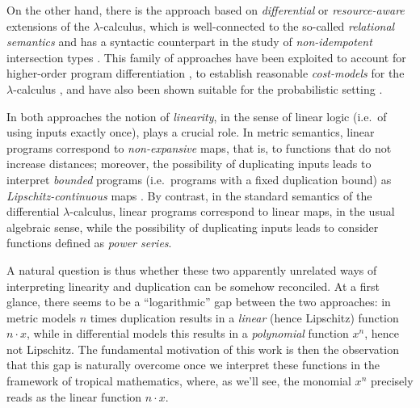 On the other hand, there is the approach based on \emph{differential} \cite{difflambda} or \emph{resource-aware} \cite{Boudol1993} extensions of the $\lambda$-calculus, which is well-connected to the so-called \emph{relational semantics} \cite{Manzo2012, Manzo2013, dill} and has a syntactic counterpart in the study of \emph{non-idempotent} intersection types \cite{decarvalho2018, Mazza2016}. This family of approaches have been exploited to account for higher-order program differentiation \cite{difflambda}, to establish reasonable \emph{cost-models} for the $\lambda$-calculus \cite{Accattoli2021}, and have also been shown suitable for the probabilistic setting \cite{Manzo2013, Breuvart2018, PistoneLICS2022}. 


In both approaches the notion of \emph{linearity}, in the sense of linear logic \cite{girardLl} (i.e.~of using inputs exactly once), plays a crucial role.
In metric semantics, linear programs correspond to \emph{non-expansive} maps, that is, to functions that do not increase distances; moreover, the possibility of duplicating inputs leads to interpret \emph{bounded} programs (i.e.~programs with a fixed duplication bound) as \emph{Lipschitz-continuous} maps \cite{Gaboardi2017}.
By contrast, in the standard semantics of the differential $\lambda$-calculus, linear programs correspond to linear maps, in the usual algebraic sense, while the possibility of duplicating inputs leads to consider functions defined as \emph{power series}.


A natural question is thus whether these two apparently unrelated ways of interpreting linearity and duplication can be somehow reconciled. At a first glance, there seems to be a  ``logarithmic'' gap between the two approaches:
in metric models $n$ times duplication results in a \emph{linear} (hence Lipschitz) function $n\cdot x$, while in differential models this results in a \emph{polynomial} function $x^{n}$, hence not Lipschitz. The fundamental motivation of this work is then the observation that 
this gap is naturally overcome once we interpret these functions in the framework of tropical mathematics, where, as we'll see, the monomial $x^{n}$ precisely reads as the linear function $n\cdot x$.

